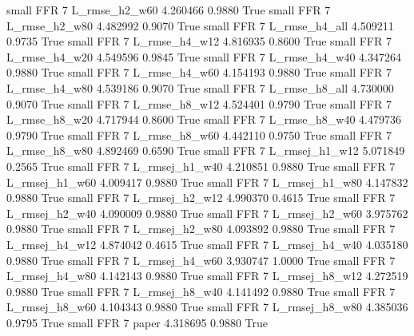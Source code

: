      small      FFR                 7  L_rmse_h2_w60   4.260466      0.9880    True
     small      FFR                 7  L_rmse_h2_w80   4.482992      0.9070    True
     small      FFR                 7  L_rmse_h4_all   4.509211      0.9735    True
     small      FFR                 7  L_rmse_h4_w12   4.816935      0.8600    True
     small      FFR                 7  L_rmse_h4_w20   4.549596      0.9845    True
     small      FFR                 7  L_rmse_h4_w40   4.347264      0.9880    True
     small      FFR                 7  L_rmse_h4_w60   4.154193      0.9880    True
     small      FFR                 7  L_rmse_h4_w80   4.539186      0.9070    True
     small      FFR                 7  L_rmse_h8_all   4.730000      0.9070    True
     small      FFR                 7  L_rmse_h8_w12   4.524401      0.9790    True
     small      FFR                 7  L_rmse_h8_w20   4.717944      0.8600    True
     small      FFR                 7  L_rmse_h8_w40   4.479736      0.9790    True
     small      FFR                 7  L_rmse_h8_w60   4.442110      0.9750    True
     small      FFR                 7  L_rmse_h8_w80   4.892469      0.6590    True
     small      FFR                 7 L_rmsej_h1_w12   5.071849      0.2565    True
     small      FFR                 7 L_rmsej_h1_w40   4.210851      0.9880    True
     small      FFR                 7 L_rmsej_h1_w60   4.009417      0.9880    True
     small      FFR                 7 L_rmsej_h1_w80   4.147832      0.9880    True
     small      FFR                 7 L_rmsej_h2_w12   4.990370      0.4615    True
     small      FFR                 7 L_rmsej_h2_w40   4.090009      0.9880    True
     small      FFR                 7 L_rmsej_h2_w60   3.975762      0.9880    True
     small      FFR                 7 L_rmsej_h2_w80   4.093892      0.9880    True
     small      FFR                 7 L_rmsej_h4_w12   4.874042      0.4615    True
     small      FFR                 7 L_rmsej_h4_w40   4.035180      0.9880    True
     small      FFR                 7 L_rmsej_h4_w60   3.930747      1.0000    True
     small      FFR                 7 L_rmsej_h4_w80   4.142143      0.9880    True
     small      FFR                 7 L_rmsej_h8_w12   4.272519      0.9880    True
     small      FFR                 7 L_rmsej_h8_w40   4.141492      0.9880    True
     small      FFR                 7 L_rmsej_h8_w60   4.104343      0.9880    True
     small      FFR                 7 L_rmsej_h8_w80   4.385036      0.9795    True
     small      FFR                 7          paper   4.318695      0.9880    True
